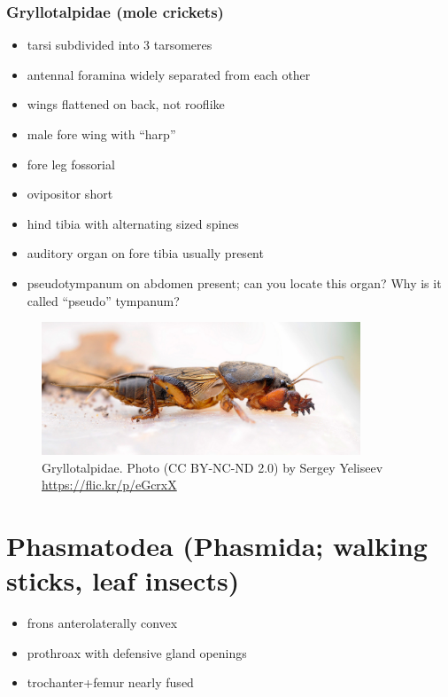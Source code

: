\documentclass[letterpaper, 11pt]{article}
\begin{document}
\subsubsection*{Gryllotalpidae (mole crickets)}
\begin{itemize}
\item tarsi subdivided into 3 tarsomeres 
\item antennal foramina widely separated from each other
\item wings flattened on back, not rooflike 
\item male fore wing with ``harp''
\item fore leg fossorial 
\item ovipositor short
\item hind tibia with alternating sized spines
\item auditory organ on fore tibia usually present
\item pseudotympanum on abdomen present; can you locate this organ? Why is it called ``pseudo'' tympanum?
\end{itemize}
\vspace{4cm}
\begin{figure}[ht!]
  \centering
    \includegraphics[width=0.85\textwidth]{gryllotalp}
  \caption{Gryllotalpidae. Photo (CC BY-NC-ND 2.0) by Sergey Yeliseev \url{https://flic.kr/p/eGcrxX}}
  \label{fig:gryllotalp}
\end{figure}

\section{Phasmatodea (Phasmida; walking sticks, leaf insects)}
\begin{itemize}
\item frons anterolaterally convex
\item prothroax with defensive gland openings
\item trochanter+femur nearly fused
\end{itemize}
\end{document}
